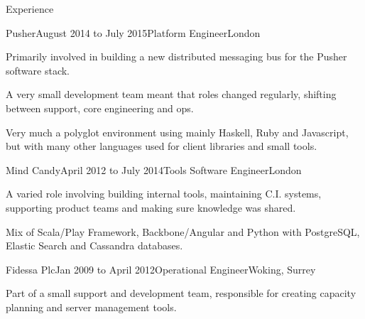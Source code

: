 \documentclass{resume} %
\begin{document}
\begin{rSection}{Experience}

  \begin{rExperience}{Pusher}{August 2014 to July 2015}{Platform Engineer}{London}
  \item Primarily involved in building a new distributed messaging bus for the Pusher software stack.
  \item A very small development team meant that roles changed regularly, shifting between support, core engineering and ops.
  \item Very much a polyglot environment using mainly Haskell, Ruby and Javascript, but with many other languages used for client libraries and small tools.
  \end{rExperience}


  \begin{rExperience}{Mind Candy}{April 2012 to July 2014}{Tools Software Engineer}{London}
  \item A varied role involving building internal tools, maintaining C.I. systems, supporting product teams and making sure knowledge was shared.
  \item Mix of Scala/Play Framework, Backbone/Angular and Python with PostgreSQL, Elastic Search and Cassandra databases.
  \end{rExperience}


  \begin{rExperience}{Fidessa Plc}{Jan 2009 to April 2012}{Operational Engineer}{Woking, Surrey}
  \item Part of a small support and development team, responsible for creating capacity planning and server management tools.
  \end{rExperience}

\end{rSection}

\pagebreak

\end{document}
